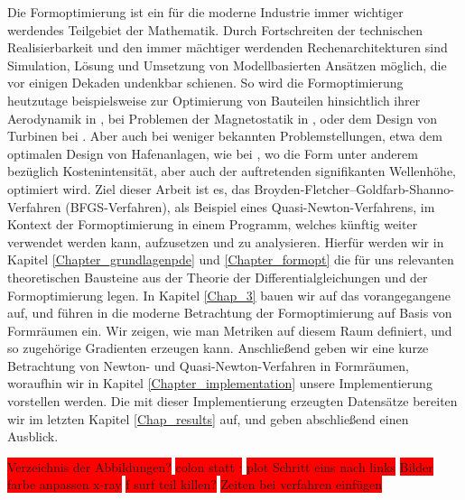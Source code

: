 \documentclass[bibliography=totoc,12pt,a4paper]{scrartcl}
\theoremstyle{exampstyle}
\numberwithin{equation}{section}
\renewenvironment{abstract}
 {\small
  \begin{center}
  \bfseries \abstractname\vspace{-.5em}\vspace{0pt}
  \end{center}
  \list{}{%
    \setlength{\leftmargin}{10mm}%
    \setlength{\rightmargin}{\leftmargin}%
  }%
  \item\relax}
 {\endlist}
\begin{document}
\begin{abstract}
Die Formoptimierung ist ein für die moderne Industrie immer wichtiger werdendes Teilgebiet der Mathematik. Durch Fortschreiten der technischen Realisierbarkeit und den immer mächtiger werdenden Rechenarchitekturen sind Simulation, Lösung und Umsetzung von Modellbasierten Ansätzen möglich, die vor einigen Dekaden undenkbar schienen. So wird die Formoptimierung heutzutage beispielsweise zur Optimierung von Bauteilen hinsichtlich ihrer Aerodynamik in \cite{abstract1}, bei Problemen der Magnetostatik in \cite{abstract2}, oder dem Design von Turbinen bei \cite{abstract4}. Aber auch bei weniger bekannten Problemstellungen, etwa dem optimalen Design von Hafenanlagen, wie bei \cite{abstract3}, wo die Form unter anderem bezüglich Kostenintensität, aber auch der auftretenden signifikanten Wellenhöhe, optimiert wird. Ziel dieser Arbeit ist es, das Broyden-Fletcher–Goldfarb-Shanno-Verfahren (BFGS-Verfahren), als Beispiel eines Quasi-Newton-Verfahrens, im Kontext der Formoptimierung in einem Programm, welches künftig weiter verwendet werden kann, aufzusetzen und zu analysieren. Hierfür werden wir in 
Kapitel \ref{Chapter_grundlagenpde} und \ref{Chapter_formopt} die für uns relevanten theoretischen Bausteine aus der Theorie der Differentialgleichungen und der Formoptimierung legen. In Kapitel \ref{Chap_3} bauen wir auf das vorangegangene auf, und führen in die moderne Betrachtung der Formoptimierung auf Basis von Formräumen ein. Wir zeigen, wie man Metriken auf diesem Raum definiert, und so zugehörige Gradienten erzeugen kann. Anschließend geben wir eine kurze Betrachtung von Newton- und Quasi-Newton-Verfahren in Formräumen, woraufhin wir in Kapitel \ref{Chapter_implementation} unsere Implementierung vorstellen werden. Die mit dieser Implementierung erzeugten Datensätze bereiten wir im letzten Kapitel \ref{Chap_results} auf, und geben abschließend einen Ausblick.
\end{abstract}
\vspace{1cm}

\colorbox{red}{Verzeichnis der Abbildungen?}
\colorbox{red}{colon statt :}
\colorbox{red}{plot Schritt eins nach links}
\colorbox{red}{Bilder farbe anpassen x-ray}
\colorbox{red}{f surf teil killen?}
\colorbox{red}{Zeiten bei verfahren einfügen}










\newpage
\nocite{*}


\end{document}
